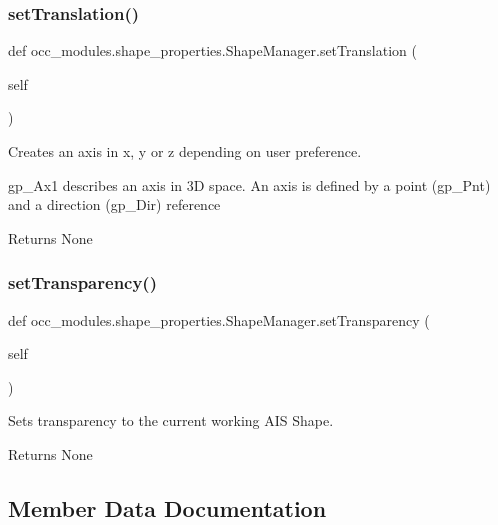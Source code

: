 \subsubsection{\texorpdfstring{set\+Translation()}{setTranslation()}}
{\footnotesize\ttfamily def occ\+\_\+modules.\+shape\+\_\+properties.\+Shape\+Manager.\+set\+Translation (\begin{DoxyParamCaption}\item[{}]{self }\end{DoxyParamCaption})}



Creates an axis in x, y or z depending on user preference. 

gp\+\_\+\+Ax1 describes an axis in 3D space. An axis is defined by a point (gp\+\_\+\+Pnt) and a direction (gp\+\_\+\+Dir) reference

\begin{DoxyReturn}{Returns}
None 
\end{DoxyReturn}
\hypertarget{classocc__modules_1_1shape__properties_1_1_shape_manager_a8d7fdd0bde28afe34d3793c8bcf060fa}{}\label{classocc__modules_1_1shape__properties_1_1_shape_manager_a8d7fdd0bde28afe34d3793c8bcf060fa} 
\subsubsection{\texorpdfstring{set\+Transparency()}{setTransparency()}}
{\footnotesize\ttfamily def occ\+\_\+modules.\+shape\+\_\+properties.\+Shape\+Manager.\+set\+Transparency (\begin{DoxyParamCaption}\item[{}]{self }\end{DoxyParamCaption})}



Sets transparency to the current working A\+IS Shape. 

\begin{DoxyReturn}{Returns}
None 
\end{DoxyReturn}


\subsection{Member Data Documentation}
\hypertarget{classocc__modules_1_1shape__properties_1_1_shape_manager_ad60197d66a3c059f30f32c2ab1a12841}{}\label{classocc__modules_1_1shape__properties_1_1_shape_manager_ad60197d66a3c059f30f32c2ab1a12841} 
